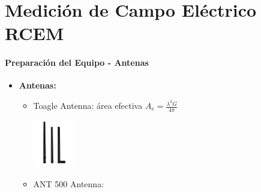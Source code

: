 \section*{Medici\'on de Campo El\'ectrico {RCEM}}
\paragraph{Preparaci\'on del Equipo - Antenas}
\begin{itemize}
	\item \textbf{Antenas:}
	\begin{itemize}
		\item Toagle Antenna: \'area efectiva $A_e = \frac{\lambda^2 G}{4 \pi}$
		\begin{center}
			\includegraphics[width=0.15\textwidth]{Figures/Toaglas.jpeg}
		\end{center}
		\item ANT 500 Antenna:
		\begin{center}
		\end{center}
	\end{itemize}
\end{itemize}

